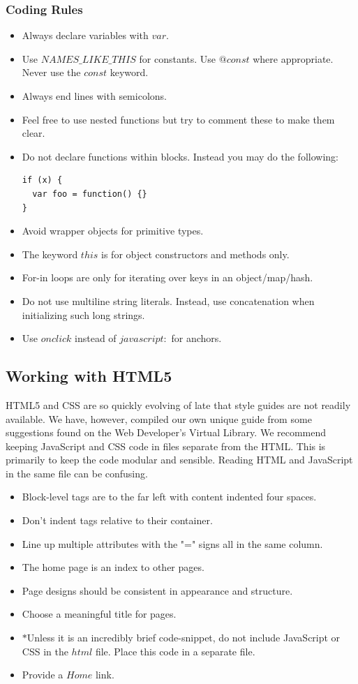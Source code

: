 \documentclass[12pt]{article}
\newenvironment{itemize*}%
  {\begin{itemize}%
  	\setlength{\parsep}{0pt}
    \setlength{\itemsep}{0pt}%
    \setlength{\parskip}{0pt}}%
  {\end{itemize}}
\begin{document}
\begin{itemize*}
\subsubsection{Coding Rules}
\begin{itemize}
\item Always declare variables with $var$.
\item Use $NAMES\_LIKE\_THIS$ for constants. Use $@const$ where appropriate. Never use the $const$ keyword. 
\item Always end lines with semicolons.
\item Feel free to use nested functions but try to comment these to make them clear.
\item Do not declare functions within blocks.  Instead you may do the following:
\begin{verbatim}
if (x) {
  var foo = function() {}
}
\end{verbatim}
\item Avoid wrapper objects for primitive types.
\item The keyword $this$ is for object constructors and methods only.
\item For-in loops are only for iterating over keys in an object/map/hash.
\item Do not use multiline string literals.  Instead, use concatenation when initializing such long strings.
\item Use $onclick$ instead of $javascript:$ for anchors.
\end{itemize}

\subsection{Working with HTML5}
HTML5 and CSS are so quickly evolving of late that style guides are not readily available.  We have, however, compiled our own unique guide from some suggestions found on the Web Developer's Virtual Library\cite{HTMLStyle-WDVL}.  We recommend keeping JavaScript and CSS code in files separate from the HTML.  This is primarily to keep the code modular and sensible.  Reading HTML and JavaScript in the same file can be confusing.

\begin{itemize}
\item Block-level tags are to the far left with content indented four spaces.
\item Don't indent tags relative to their container.
\item Line up multiple attributes with the "=" signs all in the same column.
\item The home page is an index to other pages.
\item Page designs should be consistent in appearance and structure.
\item Choose a meaningful title for pages.
\item $*$Unless it is an incredibly brief code-snippet, do not include JavaScript or CSS in the $html$ file.  Place this code in a separate file.
\item Provide a $Home$ link.
\end{itemize}


\end{itemize*}
\end{document}

